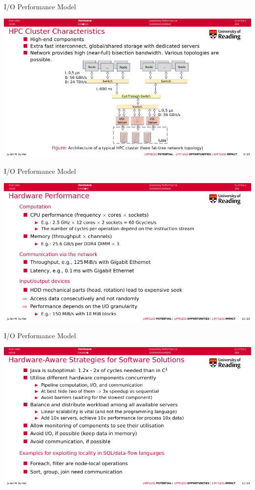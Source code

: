 \documentclass[compress,11pt,xcolor=svgnames,aspectratio=169]{beamer}
\begin{document}
\begin{frame}[t]{I/O Performance Model}

\begin{center}
\includegraphics[scale=0.7]{fig/5-2}
\end{center}

\end{frame}

\begin{frame}[t]{I/O Performance Model}

\begin{center}
\includegraphics[scale=0.7]{fig/5-3}
\end{center}

\end{frame}

\begin{frame}[t]{I/O Performance Model}

\begin{center}
\includegraphics[scale=0.7]{fig/5-4}
\end{center}

\end{frame}
\end{document}
